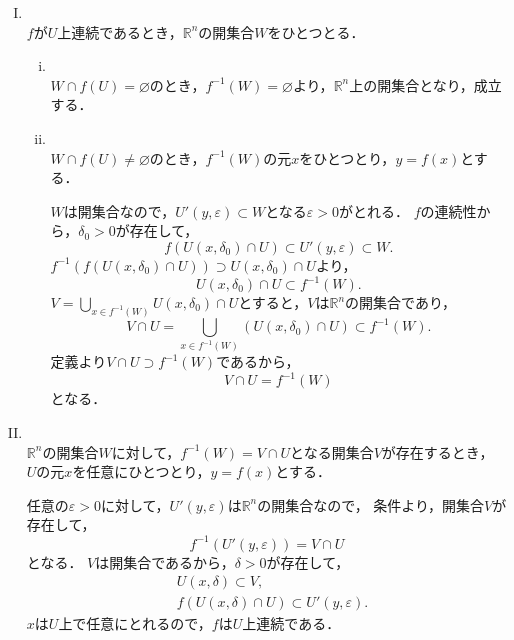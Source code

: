 \begin{tproof}
    \begin{enumerate}[(I)]
        \item \mbox{} \\
              $f$が$U$上連続であるとき，$\mathbb{R}^n$の開集合$W$をひとつとる．
              \begin{enumerate}[(i)]
                  \item \mbox{} \\
                        $W \cap f(U) = \varnothing$のとき，$f^{-1} (W) = \varnothing$より，$\mathbb{R}^n$上の開集合となり，成立する．
                  \item \mbox{} \\
                        $W \cap f(U) \ne \varnothing$のとき，$f^{-1} (W)$の元$x$をひとつとり，$y=f(x)$とする．

                        $W$は開集合なので，$U'(y,\varepsilon) \subset W$となる$\varepsilon >0$がとれる．
                        $f$の連続性から，$\delta_0 >0$が存在して，
                        \[
                            f(U(x,\delta_0) \cap U) \subset U'(y,\varepsilon) \subset W.
                        \]
                        $f^{-1} (f(U(x,\delta_0) \cap U)) \supset U(x,\delta_0) \cap U$より，
                        \[
                            U(x,\delta_0) \cap U \subset f^{-1} (W).
                        \]
                        $V = \bigcup_{x \in f^{-1}(W)} U(x,\delta_0) \cap U$とすると，$V$は$\mathbb{R}^n$の開集合であり，
                        \[
                            V \cap U = \bigcup_{x \in f^{-1}(W)} (U(x,\delta_0) \cap U)  \subset f^{-1} (W).
                        \]
                        定義より$V \cap U \supset f^{-1} (W)$であるから，
                        \[
                            V \cap U = f^{-1} (W)
                        \]
                        となる．
              \end{enumerate}
        \item \mbox{} \\
              $\mathbb{R}^n$の開集合$W$に対して，$f^{-1}(W)=V \cap U$となる開集合$V$が存在するとき，
              $U$の元$x$を任意にひとつとり，$y=f(x)$とする．

              任意の$\varepsilon >0$に対して，$U'(y,\varepsilon)$は$\mathbb{R}^n$の開集合なので，
              条件より，開集合$V$が存在して，
              \[
                  f^{-1} (U'(y,\varepsilon)) = V \cap U
              \]
              となる．
              $V$は開集合であるから，$\delta >0$が存在して，
              \begin{align*}
                   & U(x,\delta)  \subset V,                          \\
                   & f(U(x,\delta) \cap U) \subset U'(y,\varepsilon).
              \end{align*}
              $x$は$U$上で任意にとれるので，$f$は$U$上連続である．
    \end{enumerate}
\end{tproof}

